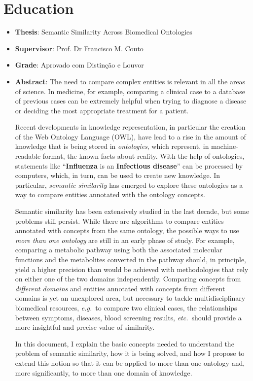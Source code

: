 \section{Education} \label{sec:education}

\begin{itemize}
  \item \textbf{Thesis}: Semantic Similarity Across Biomedical Ontologies
  \item \textbf{Supervisor}: Prof. Dr Francisco M. Couto
  \item \textbf{Grade}: Aprovado com Distinção e Louvor
  \item \textbf{Abstract}: The need to compare complex entities is relevant in all the areas of science. In medicine, for example, comparing a clinical case to a database of previous cases can be extremely helpful when trying to diagnose a disease or deciding the most appropriate treatment for a patient.
  
  \hskip20pt Recent developments in knowledge representation, in particular the creation of the Web Ontology Language (OWL), have lead to a rise in the amount of knowledge that is being stored in \emph{ontologies}, which represent, in machine-readable format, the known facts about reality. With the help of ontologies, statements like ``\textbf{Influenza} is an \textbf{Infectious disease}'' can be processed by computers, which, in turn, can be used to create new knowledge. In particular, \emph{semantic similarity} has emerged to explore these ontologies as a way to compare entities annotated with the ontology concepts.
  
  \hskip20pt Semantic similarity has been extensively studied in the last decade, but some problems still persist. While there are algorithms to compare entities annotated with concepts from the same ontology, the possible ways to use \emph{more than one ontology} are still in an early phase of study. For example, comparing a metabolic pathway using both the associated molecular functions and the metabolites converted in the pathway should, in principle, yield a higher precision than would be achieved with methodologies that rely on either one of the two domains independently. Comparing concepts from \emph{different domains} and entities annotated with concepts from different domains is yet an unexplored area, but necessary to tackle multidisciplinary biomedical resources, \emph{e.g.}~to compare two clinical cases, the relationships between symptoms, diseases, blood screening results, \emph{etc.}\ should provide a more insightful and precise value of similarity.
  
  \hskip20pt In this document, I explain the basic concepts needed to understand the problem of semantic similarity, how it is being solved, and how I propose to extend this notion so that it can be applied to more than one ontology and, more significantly, to more than one domain of knowledge.
\end{itemize}


